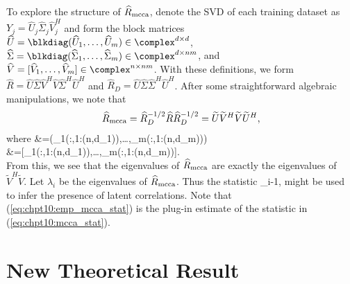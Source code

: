 To explore the structure of $\widehat{R}_{\text{mcca}}$, denote the SVD of each training dataset as
$Y_j=\widehat{U}_j\widehat{\Sigma}_j\widehat{V}_j^H$ and form the block matrices
$\widehat{U}=\blkdiag(\widehat{U}_1,\dots,\widehat{U}_m)\in\complex^{d\times d}$,
$\widehat{\Sigma}=\blkdiag(\widehat{\Sigma}_1,\dots,\widehat{\Sigma}_m)\in\complex^{d\times nm}$, and
$\widehat{V}=[\widehat{V}_1,\dots,\widehat{V}_m]\in\complex^{n\times nm}$. With these definitions, we form
$\widehat{R}=\widehat{U}\widehat{\Sigma} \widehat{V}^H\widehat{V}\widehat{\Sigma}^H\widehat{U}^H$ and $\widehat{R}_D=\widehat{U}\widehat{\Sigma}\widehat{\Sigma}^H\widehat{U}^H$. After some straightforward
algebraic manipulations, we note that
\begin{equation}\label{eq:chpt10:rmccahat}
\begin{aligned}
&\Rmccahat=\widehat{R}_D^{-1/2}\widehat{R}\widehat{R}_D^{-1/2}=\widetilde{U}\widetilde{V}^H\widetilde{V}\widetilde{U}^H,\\
\end{aligned}
\end{equation}
where 
{\small{
\be\ba
&{\small{=\blkdiag(_1(:,1:\min(n,d_1)),\dots,_m(:,1:\min(n,d_m)))}}\\
&=[_1(:,1:\min(n,d_1)),\dots,_m(:,1:\min(n,d_m))].\\
\ea\ee
}}
From this, we see that the eigenvalues of $\widehat{R}_{\text{mcca}}$ are exactly the eigenvalues of
$\widetilde{V}^H\widetilde{V}$. Let $\widehat{\lambda}_i$ be the eigenvalues of
$\widehat{R}_{\text{mcca}}$. Thus the statistic
\beq\label{eq:chpt10:emp_mcca_stat}
\widehat{\lambda}_i-1,
\eeq
might be used to infer the presence of latent correlations. Note that
(\ref{eq:chpt10:emp_mcca_stat}) is the plug-in estimate of the statistic in
(\ref{eq:chpt10:mcca_stat}). 

\section{New Theoretical Result}\label{sec:theory}


